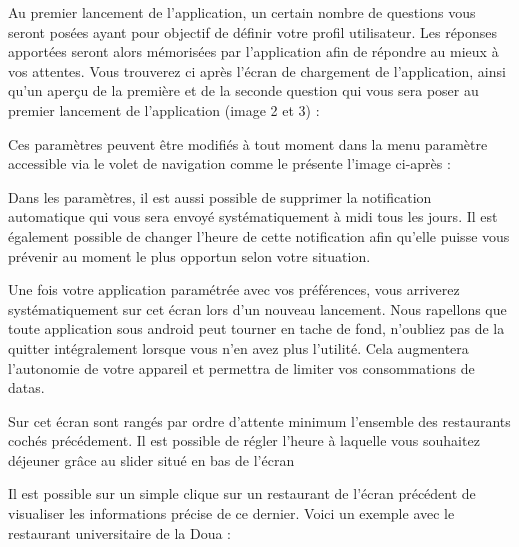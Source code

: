 Au premier lancement de l’application, un certain nombre de questions vous
seront posées ayant pour objectif de définir votre profil utilisateur. Les 
réponses apportées seront alors mémorisées par l’application afin de
répondre au mieux à vos attentes. Vous trouverez ci après l’écran de
chargement de l’application, ainsi qu’un aperçu de la première
et de la seconde question qui vous sera poser au premier lancement de
l’application (image 2 et 3) : 

Ces paramètres peuvent être modifiés à tout moment dans la menu paramètre
accessible via le volet de navigation comme le présente l’image ci-après : 

Dans les paramètres, il est aussi possible de supprimer la notification
automatique qui vous sera envoyé systématiquement à midi tous les jours. Il est
également possible de changer l’heure de cette notification afin qu’elle puisse vous
prévenir au moment le plus opportun selon votre situation. 

Une fois votre application paramétrée avec vos préférences, vous arriverez
systématiquement sur cet écran lors d’un nouveau lancement. Nous
rapellons que toute application sous android peut tourner en tache de fond,
n’oubliez pas de la quitter intégralement lorsque vous n’en avez plus l’utilité.
Cela augmentera l’autonomie de votre appareil et permettra de limiter vos
consommations de datas. 

Sur cet écran sont rangés par ordre d’attente minimum l’ensemble des
restaurants cochés précédement. Il est possible de régler l’heure à laquelle
vous souhaitez déjeuner grâce au slider situé en bas de l’écran

Il est possible sur un simple clique sur un restaurant de l’écran précédent de
visualiser les informations précise de ce dernier. Voici un exemple avec le
restaurant universitaire de la Doua : 


